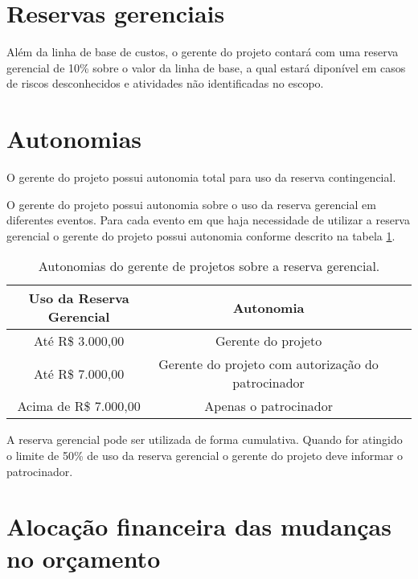 \section{Reservas gerenciais}

Além da linha de base de custos, o gerente do projeto contará com uma reserva gerencial de 10\% sobre o valor da linha de base, a qual estará diponível em casos de riscos desconhecidos e atividades não identificadas no escopo.

\section{Autonomias}

O gerente do projeto possui autonomia total para uso da reserva contingencial.

O gerente do projeto possui autonomia sobre o uso da reserva gerencial em diferentes eventos. Para cada evento em que haja necessidade de utilizar a reserva gerencial o gerente do projeto possui autonomia conforme descrito na tabela \ref{tab:project-manager-cost-autonomy}.

\begin{table}[H]
	\begin{tabularx}{\textwidth}{| c | c | X | X |}
		\hline
		\textbf{Uso da Reserva Gerencial} & \textbf{Autonomia}                                   \\
		\hline
		Até R\$ 3.000,00                 & Gerente do projeto                                   \\
		\hline
		Até R\$ 7.000,00                 & Gerente do projeto com autorização do patrocinador \\
		\hline
		Acima de R\$ 7.000,00             & Apenas o patrocinador                                \\
		\hline
	\end{tabularx}
	\caption{Autonomias do gerente de projetos sobre a reserva gerencial.}
	\centering
	\label{tab:project-manager-cost-autonomy}
\end{table}

A reserva gerencial pode ser utilizada de forma cumulativa. Quando for atingido o limite de 50\% de uso da reserva gerencial o gerente do projeto deve informar o patrocinador.

\section{Alocação financeira das mudanças no orçamento}

